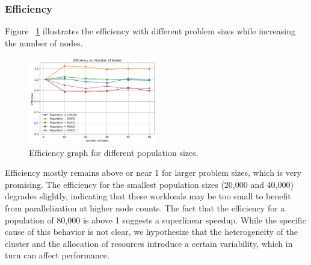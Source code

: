 \subsubsection{Efficiency}
Figure ~\ref{fig:nodes_efficiency} illustrates the efficiency with different problem sizes while increasing the number of nodes.
\newline
\begin{figure}[h]
    \centering
    \includegraphics[width=0.5\textwidth]{figures/efficiency_vs_nodes.png} %
    \caption{Efficiency graph for different population sizes.}
    \label{fig:nodes_efficiency}
\end{figure}
Efficiency mostly remains above or near 1 for larger problem sizes, which is very promising.
The efficiency for the smallest population sizes (20,000 and 40,000) degrades slightly, indicating that these workloads may be too small to benefit from parallelization at higher node counts.
The fact that the efficiency for a population of 80,000 is above 1 suggests a superlinear speedup. While the specific cause of this behavior is not clear, we hypothesize that the heterogeneity of the cluster and the allocation of resources introduce a certain variability, which in turn can affect performance.
